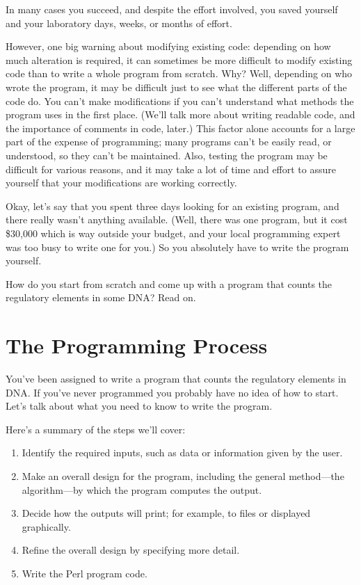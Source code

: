 In many cases you succeed, and despite the effort involved, you saved yourself and your laboratory days, weeks, or months of effort.

However, one big warning about modifying existing code: depending on how much alteration is required, it can sometimes be more difficult to modify existing code than to write a whole program from scratch. Why? Well, depending on who wrote the program, it may be difficult just to see what the different parts of the code do. You can't make modifications if you can't understand what methods the program uses in the first place. (We'll talk more about writing readable code, and the importance of comments in code, later.) This factor alone accounts for a large part of the expense of programming; many programs can't be easily read, or understood, so they can't be maintained. Also, testing the program may be difficult for various reasons, and it may take a lot of time and effort to assure yourself that your modifications are working correctly.

Okay, let's say that you spent three days looking for an existing program, and there really wasn't anything available. (Well, there was one program, but it cost \$30,000 which is way outside your budget, and your local programming expert was too busy to write one for you.) So you absolutely have to write the program yourself.

How do you start from scratch and come up with a program that counts the regulatory elements in some DNA? Read on. 

\section{The Programming Process}
You've been assigned to write a program that counts the regulatory elements in DNA. If you've never programmed you probably have no idea of how to start. Let's talk about what you need to know to write the program.

Here's a summary of the steps we'll cover:

\begin{enumerate}
  \item Identify the required inputs, such as data or information given by the user.
  \item Make an overall design for the program, including the general method—the algorithm—by which the program computes the output.
  \item Decide how the outputs will print; for example, to files or displayed graphically.
  \item Refine the overall design by specifying more detail.  
  \item Write the Perl program code.
\end{enumerate}

